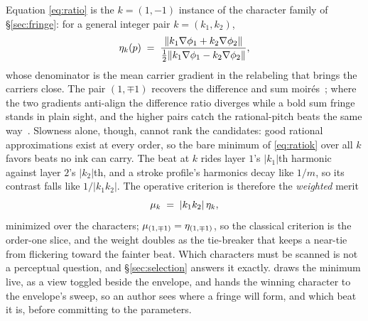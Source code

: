 Equation \eqref{eq:ratio} is the $k=(1,-1)$ instance of the character family of
\S\ref{sec:fringe}: for a general integer pair $k=(k_1,k_2)$,
\begin{equation}
  \eta_k(p) \;=\;
  \frac{\lVert k_1\nabla\phi_1+k_2\nabla\phi_2\rVert}
       {\tfrac12\lVert k_1\nabla\phi_1-k_2\nabla\phi_2\rVert},
  \label{eq:ratiok}
\end{equation}
whose denominator is the mean carrier gradient in the relabeling that brings
the carriers close. The pair $(1,\mp1)$
recovers the difference and sum moir\'es~\cite{Oster1964, Amidror2009Theory};
where the two gradients anti-align the difference ratio diverges while a bold
sum fringe stands in plain sight, and the higher pairs catch the
rational-pitch beats the same way~\cite{Amidror1994TConv}. Slowness alone,
though, cannot rank the candidates: good rational approximations exist at
every order, so the bare minimum of \eqref{eq:ratiok} over all $k$ favors
beats no ink can carry. The beat at $k$ rides layer $1$'s
$\lvert k_1\rvert$th harmonic against layer $2$'s $\lvert k_2\rvert$th, and a
stroke profile's harmonics decay like $1/m$, so its contrast falls like
$1/\lvert k_1k_2\rvert$. The operative criterion is therefore the
\emph{weighted} merit
\begin{equation}
  \mu_k \;=\; \lvert k_1 k_2\rvert\,\eta_k,
  \label{eq:merit}
\end{equation}
minimized over the characters; $\mu_{(1,\mp1)}=\eta_{(1,\mp1)}$, so the
classical criterion is the order-one slice, and the weight doubles as the
tie-breaker that keeps a near-tie from flickering toward the fainter beat.
Which characters must be scanned is not a perceptual question, and
\S\ref{sec:selection} answers it exactly. \Moire{} draws the minimum live, as
a view toggled beside the envelope, and hands the winning character to the
envelope's sweep, so an author sees where a fringe will form, and which beat
it is, before committing to the parameters.

